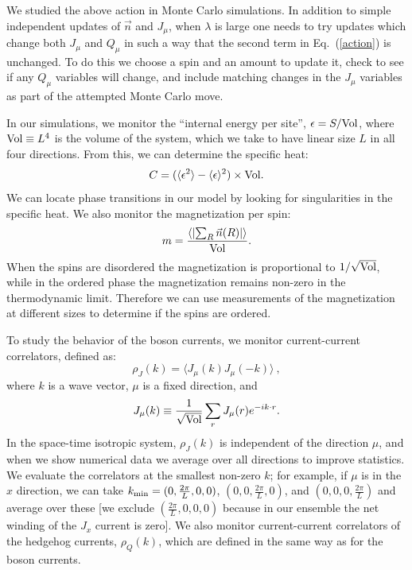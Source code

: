 \documentclass[prb,twocolumn]{revtex4-1}
\def\ra{\rangle} %
\def\la{\langle} %
\begin{document}
We studied the above action in Monte Carlo simulations. In addition to simple independent updates of $\vec{n}$ and $J_\mu$, when $\lambda$ is large one needs to try updates which change both $J_\mu$ and $Q_\mu$ in such a way that the second term in Eq.~(\ref{action}) is unchanged. To do this we choose a spin and an amount to update it, check to see if any $Q_\mu$ variables will change, and include matching changes in the $J_\mu$ variables as part of the attempted Monte Carlo move.

In our simulations, we monitor the ``internal energy per site'', $\epsilon= S /{\rm Vol}$, where ${\rm Vol}\equiv L^4$ is the volume of the system, which we take to have linear size $L$ in all four directions. From this, we can determine the specific heat:
\begin{equation}
C=(\la \epsilon^2\ra-\la\epsilon\ra^2)\times{\rm Vol}.
\end{equation}
We can locate phase transitions in our model by looking for singularities in the specific heat. We also monitor the magnetization per spin:
\begin{equation}
m = \frac{\left\la \left|\sum_R \vec{n}(R) \right|\right\ra}{\rm Vol}.
\end{equation}
When the spins are disordered the magnetization is proportional to $1/\sqrt{\rm Vol}$, while in the ordered phase the magnetization remains non-zero in the thermodynamic limit. Therefore we can use measurements of the magnetization at different sizes to determine if the spins are ordered.

To study the behavior of the boson currents, we monitor current-current correlators, defined as:
\begin{equation}
\rho_{J}({k})=\la J_\mu({k})J_\mu(-{k})\ra ~,
\label{rho}
\end{equation}
where $k$ is a wave vector, $\mu$ is a fixed direction, and 
\begin{equation}
J_\mu({k})\equiv\frac{1}{\rm \sqrt{Vol}}\sum_r J_\mu(r)e^{-i{k}\cdot r}.
\end{equation}
In the space-time isotropic system, $\rho_J({k})$ is independent of the direction $\mu$, and when we show numerical data we average over all directions to improve statistics. We evaluate the correlators at the smallest non-zero ${k}$; for example, if $\mu$ is in the $x$ direction, we can take ${k}_{\rm min}=(0,\frac{2\pi}{L},0,0)$, $(0,0,\frac{2\pi}{L},0)$, and $(0,0,0,\frac{2\pi}{L})$ and average over these [we exclude $(\frac{2\pi}{L},0,0,0)$ because in our ensemble the net winding of the $J_x$ current is zero]. We also monitor current-current correlators of the hedgehog currents, $\rho_Q(k)$, which are defined in the same way as for the boson currents.
\end{document}

